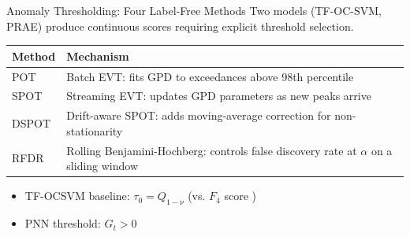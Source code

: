 \documentclass{beamer}
\begin{document}
\begin{frame}{Anomaly Thresholding: Four Label-Free Methods}
    Two models (TF-OC-SVM, PRAE) produce continuous scores requiring explicit threshold selection.
    \vspace{0.15cm}
    \begin{table}[h]
    \centering
    \footnotesize
    \begin{tabular}{lp{6.5cm}}
    \toprule
    \textbf{Method} & \textbf{Mechanism} \\
    \midrule
    POT  & Batch EVT: fits GPD to exceedances above 98th percentile \\
    SPOT \cite{siffer:hal-01640325} & Streaming EVT: updates GPD parameters as new peaks arrive \\
    DSPOT \cite{siffer:hal-01640325} & Drift-aware SPOT: adds moving-average correction for non-stationarity \\
    RFDR & Rolling Benjamini-Hochberg: controls false discovery rate at $\alpha$ on a sliding window \\
    \bottomrule
    \end{tabular}
    \end{table}
    \begin{itemize}
        \item TF-OCSVM baseline: $\tau_0 = Q_{1-\nu}$ (vs. $F_4$ score \cite{poutre_2024})
        \item PNN threshold: $G_t > 0$
    \end{itemize}
\end{frame}
\end{document}
